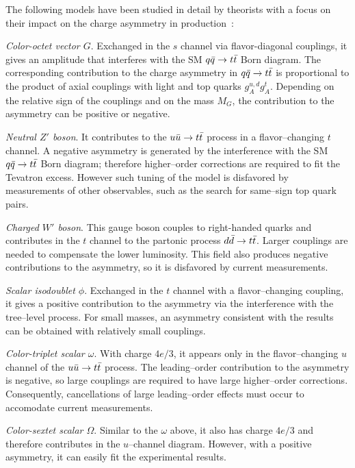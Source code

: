 The following models have been studied in
detail by theorists with a focus on their impact on the charge
asymmetry in \ttbar{} production~\cite{Aguilar-Saavedra:2014kpa}:

{\em Color-octet vector $G$}. Exchanged in the $s$ channel via
flavor-diagonal couplings, it gives 
an amplitude that interferes with the SM $q\bar{q}\to t\bar{t}$ Born diagram. The
corresponding contribution to the charge asymmetry in
\mbox{$q\bar{q}{}\to t\bar{t}{}$} is proportional to the product of axial
couplings with light and top quarks $g_A^{u,d}g_A^t$. Depending on the
relative sign of the couplings and on the mass $M_G$, the contribution
to the asymmetry can be positive or negative. 

{\em Neutral $Z'$ boson}. It contributes to the $u\bar{u}{}\to t\bar{t}{}$
process in a flavor--changing $t$ channel. A negative asymmetry
is generated by the interference with the SM $q\bar{q}\to t\bar{t}$ Born
diagram; therefore higher--order corrections are required to fit the
Tevatron excess. However such tuning of the model is disfavored by
measurements of other observables, such as the search for same--sign
top quark pairs.

{\em Charged $W'$ boson}. This gauge boson couples to right-handed
quarks and contributes in the $t$ channel to the partonic process
$d\bar{d}{}\to t\bar{t}{}$. Larger couplings are needed to compensate the
lower \ddbar{} luminosity. This field also produces negative
contributions to the asymmetry, so it is disfavored by current measurements.

{\em Scalar isodoublet $\phi$}.
Exchanged in the $t$ channel with a flavor--changing coupling, it gives
a positive contribution to the asymmetry via the interference with the
tree--level process. For small masses, an asymmetry consistent with the
\afb{} results can be obtained with relatively small couplings.

{\em Color-triplet scalar $\omega$}.
With charge $4e/3$, it appears only in the flavor--changing $u$
channel of the $u\bar{u}{}\to t\bar{t}{}$ process. The leading--order
contribution to the asymmetry is negative, so large couplings are
required to have large higher--order corrections. Consequently,
cancellations of large leading--order effects must occur to accomodate
current measurements.

{\em Color-sextet scalar $\Omega$}.
Similar to the $\omega$ above, it also has charge $4e/3$ and therefore
contributes in the $u$--channel diagram. However, with a positive
asymmetry, it can easily fit the experimental results.

